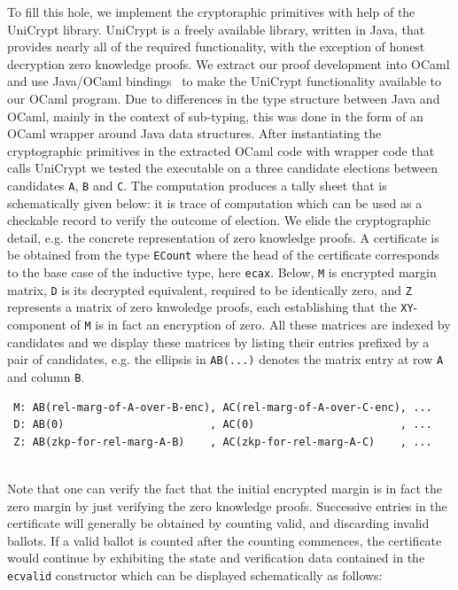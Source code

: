To fill this hole, we implement the cryptoraphic primitives with
help of the UniCrypt library\citep{LocherH14}.
UniCrypt is a freely available library, written in Java,  that provides nearly all of
the required functionality, with the exception of honest decryption
zero knowledge proofs.  We extract our proof development into OCaml
and use Java/OCaml bindings~\citep{OCamlJava} to make the UniCrypt
functionality available to our OCaml program. Due to differences
in the type structure between Java and OCaml, mainly in the context
of sub-typing, this was done in the form of an OCaml wrapper around
Java data structures.  After instantiating the  
 cryptographic primitives in the extracted OCaml code with wrapper
 code that calls UniCrypt
 we tested the executable on a three candidate elections between
 candidates \texttt{A}, \texttt{B} and \texttt{C}.
 The computation produces a tally sheet that is schematically given
 below:
 it is trace of computation which can be used as a checkable record to verify
 the outcome of election. We elide the cryptographic detail, e.g.
 the concrete representation of zero knowledge proofs.
 A certificate
 is be obtained from the type \texttt{ECount} where the head
 of the certificate corresponds to the base case of the inductive
 type, here \texttt{ecax}. Below, \texttt{M} is encrypted margin
 matrix, \texttt{D} is its decrypted equivalent, required to be
 identically zero, and \texttt{Z} represents a matrix of zero
 knwoledge proofs, each establishing that the \texttt{XY}-component
 of \texttt{M} is in fact an encryption of zero. All these matrices
 are indexed by candidates and we display these matrices by listing
 their entries prefixed by a pair of candidates, e.g. the ellipsis
 in \texttt{AB(...)} denotes the matrix entry at row \texttt{A} and
 column \texttt{B}.

 {\small
 \begin{verbatim}
 M: AB(rel-marg-of-A-over-B-enc), AC(rel-marg-of-A-over-C-enc), ... 
 D: AB(0)                       , AC(0)                       , ...
 Z: AB(zkp-for-rel-marg-A-B)    , AC(zkp-for-rel-marg-A-C)    , ...
 \end{verbatim}}
 
 \mbox{}\\[-5ex]
 Note that one can verify the fact that the initial encrypted margin
 is in fact the zero margin by just verifying the zero knowledge
 proofs. Successive entries in the certificate will generally be
 obtained by counting valid, and discarding invalid ballots. If a
 valid ballot is counted after the counting commences, the
 certificate would continue by exhibiting the state and verification
 data contained in the \texttt{ecvalid} constructor which can be
 displayed schematically as follows:

